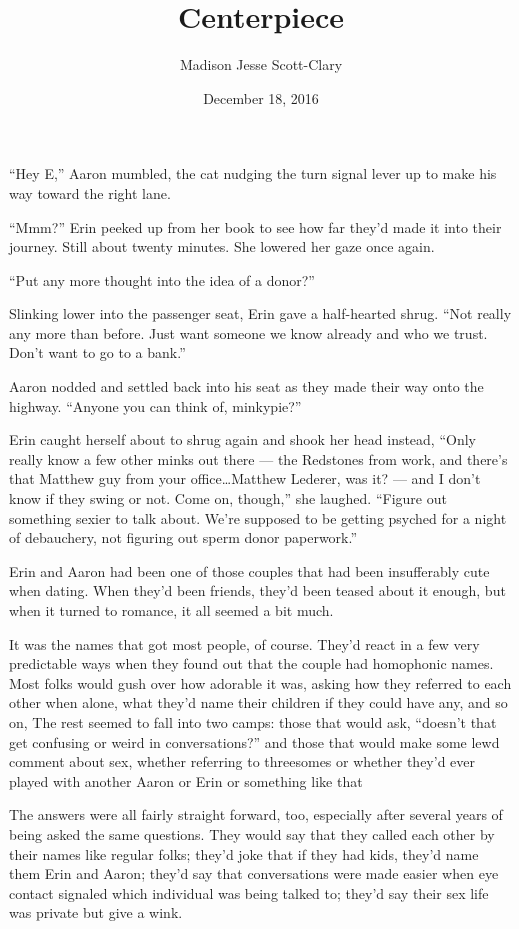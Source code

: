 \documentclass[12pt,letterpaper,oneside]{memoir}
\title{Centerpiece}
\author{Madison Jesse Scott-Clary}
\date{December 18, 2016}
\begin{document}
  \maketitle

  ``Hey E,'' Aaron mumbled, the cat nudging the turn signal lever up to make his way toward the right lane.

  ``Mmm?'' Erin peeked up from her book to see how far they'd made it into their journey. Still about twenty minutes. She lowered her gaze once again.

  ``Put any more thought into the idea of a donor?''

  Slinking lower into the passenger seat, Erin gave a half-hearted shrug. ``Not really any more than before. Just want someone we know already and who we trust. Don't want to go to a bank.''

  Aaron nodded and settled back into his seat as they made their way onto the highway. ``Anyone you can think of, minkypie?''

  Erin caught herself about to shrug again and shook her head instead, ``Only really know a few other minks out there --- the Redstones from work, and there's that Matthew guy from your office\ldots{}Matthew Lederer, was it? --- and I don't know if they swing or not. Come on, though,'' she laughed. ``Figure out something sexier to talk about. We're supposed to be getting psyched for a night of debauchery, not figuring out sperm donor paperwork.''

  Erin and Aaron had been one of those couples that had been insufferably cute when dating. When they'd been friends, they'd been teased about it enough, but when it turned to romance, it all seemed a bit much.

  It was the names that got most people, of course. They'd react in a few very predictable ways when they found out that the couple had homophonic names. Most folks would gush over how adorable it was, asking how they referred to each other when alone, what they'd name their children if they could have any, and so on, The rest seemed to fall into two camps: those that would ask, ``doesn't that get confusing or weird in conversations?'' and those that would make some lewd comment about sex, whether referring to threesomes or whether they'd ever played with another Aaron or Erin or something like that

  The answers were all fairly straight forward, too, especially after several years of being asked the same questions. They would say that they called each other by their names like regular folks; they'd joke that if they had kids, they'd name them Erin and Aaron; they'd say that conversations were made easier when eye contact signaled which individual was being talked to; they'd say their sex life was private but give a wink.
\end{document}
